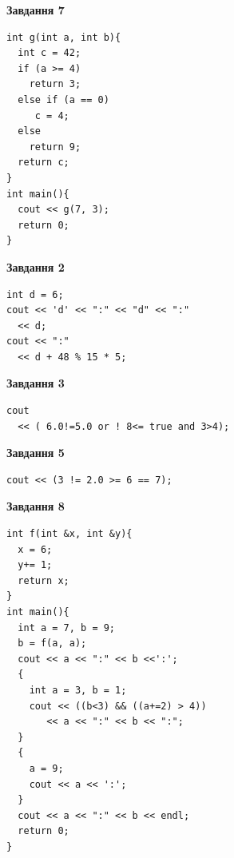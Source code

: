 \documentclass[12pt, ukrainian]{article}
\begin{document}
{\begin {large}
\begin{minipage}[t]{7.0cm}
\begin{center}
\textbf{Завдання 7}
\end{center}
\vspace{-8mm}

\begin{verbatim}
int g(int a, int b){
  int c = 42;
  if (a >= 4)
    return 3;
  else if (a == 0)
     c = 4;
  else
    return 9;
  return c;
}
int main(){
  cout << g(7, 3);
  return 0;
}
\end{verbatim}

\end{minipage}
\vline \hspace{1mm}
\begin{minipage}[t]{11.0cm}

\begin{center}
\textbf{Завдання 2}
\end{center}
\vspace{-8mm}

\begin{verbatim}
int d = 6;
cout << 'd' << ":" << "d" << ":" 
  << d;
cout << ":" 
  << d + 48 % 15 * 5;
\end{verbatim}



\begin{center}
\textbf{Завдання 3}
\end{center}
\vspace{-8mm}

\begin{verbatim}
cout 
  << ( 6.0!=5.0 or ! 8<= true and 3>4);
\end{verbatim}



\begin{center}
\textbf{Завдання 5}
\end{center}
\vspace{-8mm}

\begin{verbatim}
cout << (3 != 2.0 >= 6 == 7);
\end{verbatim}



\begin{center}
\textbf{Завдання 8}
\end{center}
\vspace{-8mm}

\begin{verbatim}
int f(int &x, int &y){
  x = 6;
  y+= 1;
  return x;
}
int main(){
  int a = 7, b = 9;
  b = f(a, a);
  cout << a << ":" << b <<':';
  {
    int a = 3, b = 1;
    cout << ((b<3) && ((a+=2) > 4))
       << a << ":" << b << ":";
  }
  {
    a = 9;
    cout << a << ':';
  }
  cout << a << ":" << b << endl;
  return 0;
}
\end{verbatim}


\end{minipage}
\end{large}}
\end{document}
